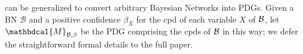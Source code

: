 \documentclass[letterpaper]{article} %
\theoremstyle{plain}
\theoremstyle{definition}
\theoremstyle{remark}
\newcommand{\dg}[1]{\mathbdcal{#1}}
\newcommand{\PDGof}[1]{{\dg M}_{#1}}
\begin{document}
 can be generalized to convert arbitrary Bayesian Networks into PDGs.
Given a BN $\mathcal B$ and a positive confidence $\beta_X$ for
the cpd of each variable $X$ of $\cal B$,
let $\PDGof{\mathcal B, \beta}$
be the PDG comprising the cpds of $\cal B$
in this way; we defer the straightforward formal details to the full paper. 
\end{document}
